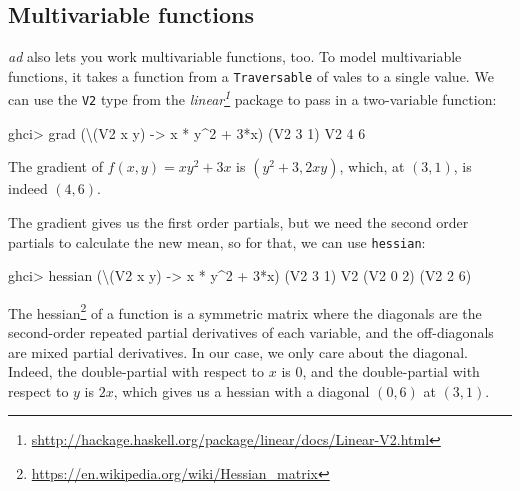 \documentclass[]{article}
\newenvironment{Shaded}{}{}
\newcommand{\DataTypeTok}[1]{\textcolor[rgb]{0.56,0.13,0.00}{{#1}}}
\newcommand{\DecValTok}[1]{\textcolor[rgb]{0.25,0.63,0.44}{{#1}}}
\newcommand{\OtherTok}[1]{\textcolor[rgb]{0.00,0.44,0.13}{{#1}}}
\newcommand{\FunctionTok}[1]{\textcolor[rgb]{0.02,0.16,0.49}{{#1}}}
\newcommand{\NormalTok}[1]{{#1}}
\renewcommand{\href}[2]{#2\footnote{\url{#1}}}
\begin{document}
\subsection{Multivariable functions}\label{multivariable-functions}

\emph{ad} also lets you work multivariable functions, too. To model
multivariable functions, it takes a function from a \texttt{Traversable}
of vales to a single value. We can use the \texttt{V2} type from the
\emph{\href{shttp://hackage.haskell.org/package/linear/docs/Linear-V2.html}{linear}}
package to pass in a two-variable function:

\begin{Shaded}
\begin{Highlighting}[]
\NormalTok{ghci}\FunctionTok{>} \NormalTok{grad (\textbackslash{}(}\DataTypeTok{V2} \NormalTok{x y) }\OtherTok{->} \NormalTok{x }\FunctionTok{*} \NormalTok{y}\FunctionTok{^}\DecValTok{2} \FunctionTok{+} \DecValTok{3}\FunctionTok{*}\NormalTok{x) (}\DataTypeTok{V2} \DecValTok{3} \DecValTok{1}\NormalTok{)}
\DataTypeTok{V2} \DecValTok{4} \DecValTok{6}
\end{Highlighting}
\end{Shaded}

The gradient of \(f(x, y) = x y^2 + 3x\) is \((y^2 + 3, 2xy)\), which,
at \((3, 1)\), is indeed \((4, 6)\).

The gradient gives us the first order partials, but we need the second
order partials to calculate the new mean, so for that, we can use
\texttt{hessian}:

\begin{Shaded}
\begin{Highlighting}[]
\NormalTok{ghci}\FunctionTok{>} \NormalTok{hessian (\textbackslash{}(}\DataTypeTok{V2} \NormalTok{x y) }\OtherTok{->} \NormalTok{x }\FunctionTok{*} \NormalTok{y}\FunctionTok{^}\DecValTok{2} \FunctionTok{+} \DecValTok{3}\FunctionTok{*}\NormalTok{x) (}\DataTypeTok{V2} \DecValTok{3} \DecValTok{1}\NormalTok{)}
\DataTypeTok{V2} \NormalTok{(}\DataTypeTok{V2} \DecValTok{0} \DecValTok{2}\NormalTok{)}
   \NormalTok{(}\DataTypeTok{V2} \DecValTok{2} \DecValTok{6}\NormalTok{)}
\end{Highlighting}
\end{Shaded}

The \href{https://en.wikipedia.org/wiki/Hessian_matrix}{hessian} of a
function is a symmetric matrix where the diagonals are the second-order
repeated partial derivatives of each variable, and the off-diagonals are
mixed partial derivatives. In our case, we only care about the diagonal.
Indeed, the double-partial with respect to \(x\) is \(0\), and the
double-partial with respect to \(y\) is \(2x\), which gives us a hessian
with a diagonal \((0, 6)\) at \((3, 1)\).
\end{document}
